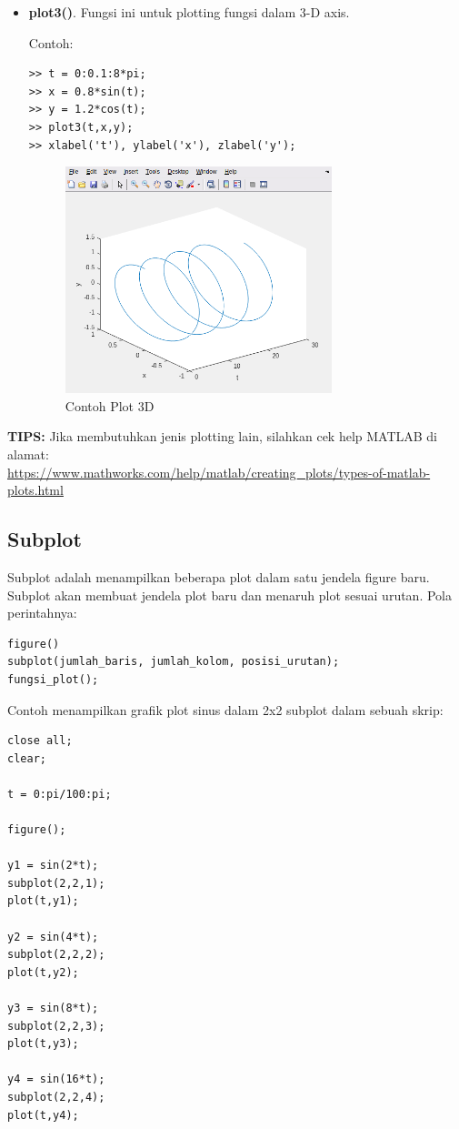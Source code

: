 \documentclass[12pt]{book}
\begin{document}
\begin{itemize}
		\item \textbf{plot3()}. Fungsi ini untuk plotting fungsi dalam 3-D axis.
		
		Contoh:
		\begin{verbatim}
>> t = 0:0.1:8*pi;
>> x = 0.8*sin(t);
>> y = 1.2*cos(t);
>> plot3(t,x,y);
>> xlabel('t'), ylabel('x'), zlabel('y');
		\end{verbatim}
		
		\newpage
		\begin{figure}[!ht]
			\centering
			\includegraphics[width=220pt]{images/plot3d}
			\caption{Contoh Plot 3D}
		\end{figure}
	\end{itemize}

	\textbf{TIPS:} Jika membutuhkan jenis plotting lain, silahkan cek help MATLAB di alamat:\\
	\url{https://www.mathworks.com/help/matlab/creating_plots/types-of-matlab-plots.html}

	\subsection{Subplot}
	
	Subplot adalah menampilkan beberapa plot dalam satu jendela figure baru.
	Subplot akan membuat jendela plot baru dan menaruh plot sesuai urutan.
	Pola perintahnya:
	\begin{verbatim}
figure()
subplot(jumlah_baris, jumlah_kolom, posisi_urutan);
fungsi_plot();
	\end{verbatim}

	Contoh menampilkan grafik plot sinus dalam 2x2 subplot dalam sebuah skrip:
	\begin{verbatim}
close all;
clear;

t = 0:pi/100:pi;

figure();

y1 = sin(2*t);
subplot(2,2,1);
plot(t,y1);

y2 = sin(4*t);
subplot(2,2,2);
plot(t,y2);

y3 = sin(8*t);
subplot(2,2,3);
plot(t,y3);

y4 = sin(16*t);
subplot(2,2,4);
plot(t,y4);
	\end{verbatim}
\end{document}
